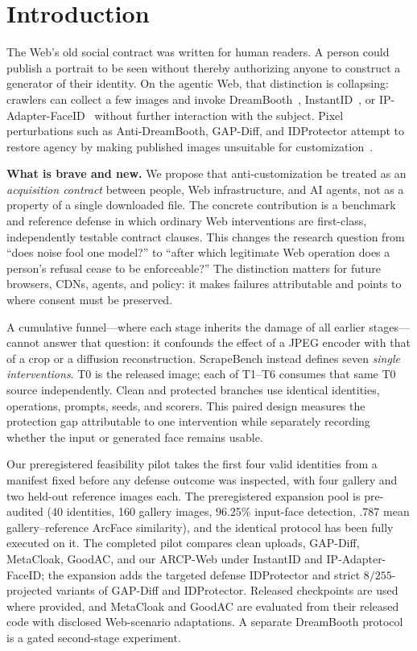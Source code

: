 \section{Introduction}

The Web's old social contract was written for human readers. A person could
publish a portrait to be seen without thereby authorizing anyone to construct a
generator of their identity. On the agentic Web, that distinction is collapsing:
crawlers can collect a few images and invoke DreamBooth~\cite{ruiz2022dreambooth},
InstantID~\cite{wang2024instantid}, or IP-Adapter-FaceID~\cite{ye2023ipadapter}
without further interaction with the subject. Pixel perturbations such as
Anti-DreamBooth, GAP-Diff, and IDProtector attempt to restore agency by making
published images unsuitable for customization~\cite{le2023antidreambooth,zhu2025gapdiff,song2024idprotector}.

\textbf{What is brave and new.} We propose that anti-customization be treated
as an \emph{acquisition contract} between people, Web infrastructure, and AI
agents, not as a property of a single downloaded file. The concrete contribution
is a benchmark and reference defense in which ordinary Web interventions are
first-class, independently testable contract clauses. This changes the research
question from ``does noise fool one model?'' to ``after which legitimate Web
operation does a person's refusal cease to be enforceable?'' The distinction
matters for future browsers, CDNs, agents, and policy: it makes failures
attributable and points to where consent must be preserved.



A cumulative funnel---where each stage inherits the damage of all earlier
stages---cannot answer that question: it confounds the effect of a JPEG encoder
with that of a crop or a diffusion reconstruction. ScrapeBench instead defines
seven \emph{single interventions}. T0 is the released image; each of T1--T6
consumes that same T0 source independently. Clean and protected branches use
identical identities, operations, prompts, seeds, and scorers. This paired
design measures the protection gap attributable to one intervention while
separately recording whether the input or generated face remains usable.

Our preregistered feasibility pilot takes the first four valid identities from
a manifest fixed before any defense outcome was inspected, with four gallery
and two held-out reference images each. The preregistered expansion pool is
pre-audited (40 identities, 160 gallery images, 96.25\% input-face detection,
.787 mean gallery--reference ArcFace similarity), and the identical protocol
has been fully executed on it. The completed pilot compares clean uploads,
GAP-Diff, MetaCloak, GoodAC, and our ARCP-Web under InstantID and
IP-Adapter-FaceID; the expansion adds the targeted defense IDProtector and
strict $8/255$-projected variants of GAP-Diff and IDProtector. Released
checkpoints are used where provided, and MetaCloak and GoodAC are evaluated
from their released code with disclosed Web-scenario adaptations. A separate
DreamBooth protocol is a gated second-stage experiment.

